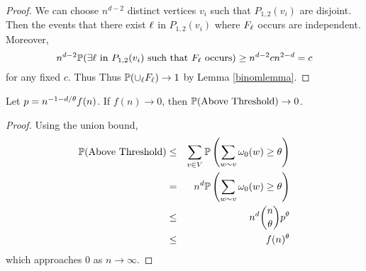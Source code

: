 \begin{proof}
We can choose $n^{d-2}$ distinct vertices $v_i$ such that $P_{1,2}(v_i)$ are disjoint. Then the
events that there exist $\ell$ in $P_{1,2}(v_i)$ where $F_\ell$ occurs are independent.
Moreover, 
$$n^{d-2}\mathbb{P}(\exists \ell \text{ in $P_{1,2}(v_i)$ such that $F_\ell$ occurs})
\geq n^{d-2}cn^{2-d}=c$$
for any fixed $c$. Thus
Thus $\mathbb{P}(\cup_\ell F_\ell)\to 1$ by Lemma \ref{binomlemma}. 
\end{proof}

\begin{theorem}\label{molar}
Let $p = n^{-1-d/\theta}f(n)$. If $f(n) \to 0$, then $\mathbb{P}(\text{Above Threshold}) \to 0$. 
\end{theorem}

\begin{proof} 
Using the union bound, 
\begin{eqnarray*}
\mathbb{P}(\text{Above Threshold}) 
&\leq& \sum_{v \in V}\mathbb{P}\left(\sum_{w \sim v}\omega_0(w)\geq \theta \right)\\
&=& n^d\mathbb{P}\left(\sum_{w \sim v}\omega_0(w)\geq \theta \right)\\
&\le& n^d{n \choose \theta}p^\theta\\
&\le& f(n)^\theta 
\end{eqnarray*}
which approaches 0 as $n \to \infty$.
%
\end{proof}

